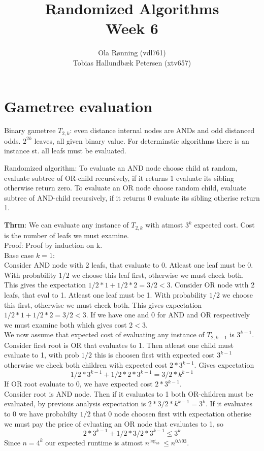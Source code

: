 \documentclass[a4paper]{article}
\author{Ola Rønning (vdl761)\\Tobias Hallundbæk Petersen (xtv657)}
\title{Randomized Algorithms \\ Week 6}
\begin{document}
\section{Gametree evaluation}
Binary gametree \(T_{2,k}\): even distance internal nodes are ANDs and odd distanced odds. \(2^{2k}\) leaves, all given binary value. For determinstic algorithms there is an instance st. all leafs must be evaluated.


Randomized algorithm: To evaluate an AND node choose child at random, evaluate subtree of OR-child recursively, if it returns 1 evaluate its sibling otherwise return zero. To evaluate an OR node choose random child, evaluate subtree of AND-child recursively, if it returns 0 evaluate its sibling otherise return 1.

\textbf{Thrm}: We can evaluate any instance of \(T_{2,k}\) with atmost \(3^k\) expected cost. Cost is the number of leafs we must examine.\\
Proof: Proof by induction on k.\\
Base case \(k=1\):\\
Consider AND node with 2 leafs, that evaluate to 0. Atleast one leaf must be 0. With probability \(1/2\) we choose this leaf first, otherwise we must check both. This gives the expectation \(1/2 * 1 + 1/2 * 2 = 3/2< 3\).
Consider OR node with 2 leafs, that eval to 1. Atleast one leaf must be 1. With probability \(1/2\) we choose this first, otherwise we must check both. This gives expectation \(1/2 * 1 + 1/2 * 2 = 3/2 < 3\). If we have one and 0 for AND and OR respectively we must examine both which gives cost \(2<3\).\\
We now assume that expected cost of evaluating any instance of \(T_{2,k-1}\) is \(3^{k-1}\). Consider first root is OR that evaluates to 1. Then atleast one child must evaluate to 1, with prob \(1/2\) this is choosen first with expected cost \(3^{k-1}\) otherwise we check both children with expected cost \(2*3^{k-1}\). Gives expectation 
\[1/2*3^{k-1} + 1/2 * 2 * 3^{k-1} = 3/2 * k^{k-1}\]
If OR root evaluate to 0, we have expected cost \(2*3^{k-1}\).\\
Consider root is AND node. Then if it evaluates to 1 both OR-children must be evaluated, by previous analysis expectation is \(2*3/2*k^{k-1} = 3^k\). If it evaluates to 0 we have probabilty \(1/2\) that 0 node choosen first with expectation otherise we must pay the price of evluating an OR node that evaluates to 1, so
\[2*3^{k-1} + 1/2*3/2*3^{k-1} \leq 3^k\] 
Since \(n=4^k\) our expected runtime is atmost \(n^{\log_43}\ \leq n^{0.793}\).
\end{document}
